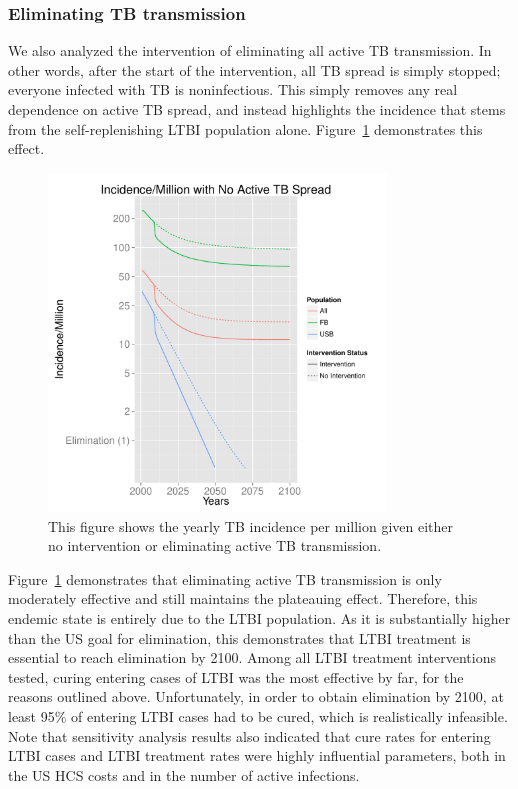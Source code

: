 \documentclass{amsart}
\renewcommand{\(}{\left(}
\renewcommand{\)}{\right)}
\begin{document}
\subsubsection{Eliminating TB transmission}
We also analyzed the intervention of eliminating all active TB transmission. In
other words, after the start of the intervention, all TB spread is simply
stopped; everyone infected with TB is noninfectious. This simply removes any
real dependence on active TB spread, and instead highlights the incidence that
stems from the self-replenishing LTBI population alone.
Figure~\ref{fig:redTrans100} demonstrates this effect. 
\begin{figure}[h]
  \centering
  \includegraphics[width=0.8\textwidth,page=1]{figures/redTrans100Analysis}
  \caption{This figure shows the yearly TB incidence per million given either no
  intervention or eliminating active TB transmission.}
  \label{fig:redTrans100}
\end{figure}

Figure~\ref{fig:redTrans100} demonstrates that eliminating active TB
transmission is only moderately effective and still maintains the plateauing
effect. Therefore, this endemic state is entirely due to the LTBI population. As
it is substantially higher than the US goal for elimination, this demonstrates
that LTBI treatment is essential to reach elimination by 2100. Among all LTBI
treatment interventions tested, curing entering cases of LTBI was the most
effective by far, for the reasons outlined above. Unfortunately, in order to
obtain elimination by 2100, at least 95\% of entering LTBI cases had to
be cured, which is realistically infeasible. Note that sensitivity analysis
results also indicated that cure rates for entering LTBI cases and LTBI
treatment rates were highly influential parameters, both in the US HCS costs and
in the number of active infections. 
\end{document}

